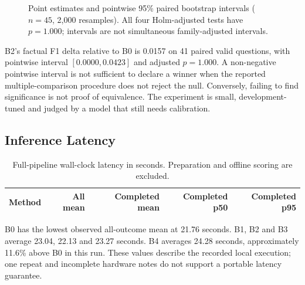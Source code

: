 \begin{figure}[H]\centering
{}
\caption{Point estimates and pointwise 95\% paired bootstrap intervals ($n=45$, 2,000 resamples). All four Holm-adjusted tests have $p=1.000$; intervals are not simultaneous family-adjusted intervals.}\label{fig:ci}
\end{figure}

B2's factual F1 delta relative to B0 is 0.0157 on 41 paired valid questions, with pointwise interval $[0.0000,0.0423]$ and adjusted $p=1.000$. A non-negative pointwise interval is not sufficient to declare a winner when the reported multiple-comparison procedure does not reject the null. Conversely, failing to find significance is not proof of equivalence. The experiment is small, development-tuned and judged by a model that still needs calibration.

\subsection{Inference Latency}
\begin{table}[H]\centering\small
\caption{Full-pipeline wall-clock latency in seconds. Preparation and offline scoring are excluded.}\label{tab:latency}
\begin{tabular}{lrrrr}\toprule
\textbf{Method} & \textbf{All mean} & \textbf{Completed mean} & \textbf{Completed p50} & \textbf{Completed p95}\\\midrule

\bottomrule\end{tabular}
\end{table}

B0 has the lowest observed all-outcome mean at 21.76 seconds. B1, B2 and B3 average 23.04, 22.13 and 23.27 seconds. B4 averages 24.28 seconds, approximately 11.6\% above B0 in this run. These values describe the recorded local execution; one repeat and incomplete hardware notes do not support a portable latency guarantee.

